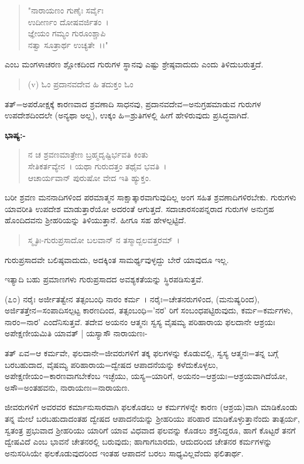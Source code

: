 \begin{verse}
"ನಾರಾಯಣಂ ಗುಣೈಃ ಸರ್ವೈಃ\\ ಉದೀರ್ಣಂ ದೋಷವರ್ಜಿತಂ~।\\ಜ್ಞೇಯಂ ಗಮ್ಯಂ ಗುರೂಂಶ್ಚಾಪಿ\\ ನತ್ವಾ ಸೂತ್ರಾರ್ಥ ಉಚ್ಯತೇ~।।"
\end{verse}

\noindent
ಎಂಬ ಮಂಗಳಾಚರಣ ಶ್ಲೋಕದಿಂದ ಗುರುಗಳ ಸ್ಥಾನವು ಎಷ್ಟು ಶ್ರೇಷ್ಠವಾದುದು ಎಂದು ತಿಳಿದುಬರುತ್ತದೆ.

\begin{verse}
(v) ಓಂ ಪ್ರದಾನವದೇವ ಹಿ ತದುಕ್ತಂ ಓಂ
\end{verse}

ತತ್=ಅಪರೋಕ್ಷಕ್ಕೆ ಕಾರಣವಾದ ಶ್ರವಣಾದಿ ಸಾಧನವು, ಪ್ರದಾನವದೇವ=ಅನುಗ್ರಹಮಾಡುವ ಗುರುಗಳ ಉಪದೇಶದಿಂದಲೇ (ಅನ್ಯಥಾ ಅಲ್ಲ), ಉಕ್ಕಂ ಹಿ=ಶ್ರುತಿಗಳಲ್ಲಿ ಹೀಗೆ ಹೇಳಿರುವುದು ಪ್ರಸಿದ್ಧವಾಗಿದೆ.

\noindent
\textbf{ಭಾಷ್ಯ:-}

\begin{verse}
ನ ಚ ಶ್ರವಣಮಾತ್ರೇಣ ಬ್ರಹ್ಮದೃಷ್ಟಿರ್ಭವತಿ ಕಿಂತು\\ ಸೇತಿಕರ್ತವ್ಯೇನ~। ಯಥಾ ಗುರುದತ್ತಂ ತಥೈವ ಭವತಿ~।\\ ಆಚಾರ್ಯವಾನ್ ಪುರುಷೋ ವೇದ ಇತಿ ಹ್ಯುಕ್ತಂ.
\end{verse}

ಬರೀ ಶ್ರವಣ ಮನನಾದಿಗಳಿಂದ ಪರಮಾತ್ಮನ ಸಾಕ್ಷಾತ್ಕಾರವಾಗುವುದಿಲ್ಲ ಅಂಗ ಸಹಿತ ಶ್ರವಣಾದಿಗಳಿರಬೇಕು. ಗುರುಗಳು ಯಾವರೀತಿ ಉಪದೇಶ ಮಾಡುತ್ತಾರೆಯೋ ಅದರಂತೆ ಆಗುತ್ತದೆ. ಸದಾಚಾರಸಂಪನ್ನರಾದ ಗುರುಗಳ ಅನುಗ್ರಹ ಹೊಂದಿದವನು ಶ‍್ರೀಹರಿಯನ್ನು ತಿಳಿಯುತ್ತಾನೆ. ಹೀಗೂ ಸಹ ಹೇಳಲ್ಪಟ್ಟಿದೆ.

\begin{verse}
ಸ್ಮೃತಿಃ-ಗುರುಪ್ರಸಾದೋ ಬಲವಾನ್ ನ ತಸ್ಮಾದ್ಬಲವತ್ತರಮ್~।
\end{verse}

ಗುರುಪ್ರಸಾದವೇ ಬಲಿಷ್ಠವಾದುದು, ಅದಕ್ಕಿಂತ ಸಾಮರ್ಥ್ಯವುಳ್ಳದ್ದು ಬೇರೆ ಯಾವುದೂ ಇಲ್ಲ.

ಇತ್ಯಾದಿ ಬಹು ಪ್ರಮಾಣಗಳು ಗುರುಪ್ರಸಾದದ ಅವಶ್ಯಕತೆಯನ್ನು ಸ್ಥಿರಪಡಿಸುತ್ತವೆ.

(೭೦) ನರೈಃ ಅರ್ಜೀತತ್ವೇನ ತತ್ಸಂಬಂಧಿ ನಾರಂ ಕರ್ಮ~। ನರೈಃ=ಚೇತನರುಗಳಿಂದ, (ಮನುಷ್ಯರಿಂದ), ಅರ್ಜಿತತ್ತೇನ=ಸಂಪಾದಿಸಲ್ಪಟ್ಟ ಕಾರಣದಿಂದ, ತತ್ಸಂಬಂಧಿ='ನರ' ರಿಗೆ ಸಂಬಂಧಪಟ್ಟಿರುವುದು, ಕರ್ಮ=ಕರ್ಮಗಳು, ನಾರಂ=ನಾರ' ಎಂದೆನಿಸುತ್ತವೆ. ತದೇವ ಅಯನಂ ಆತ್ಮನಃ ಸ್ವಸ್ಯ ವೈಷಮ್ಯ ಪರಿಹಾರಾಯ ಫಲದಾನೇ ಆಶ್ರಯಃ ಅಪೇಕ್ಷಣೀಯಮಿತಿ ಯಾವತ್ | ಯಸ್ಯಾಸೌ ನಾರಾಯಣಃ-

ತತ್ ಏವ=ಆ ಕರ್ಮವೇ, ಫಲದಾನೇ=ಜೀವರುಗಳಿಗೆ ತಕ್ಕ ಫಲಗಳನ್ನು ಕೊಡುವಲ್ಲಿ, ಸ್ವಸ್ಯ ಆತ್ಮನಃ=ತನ್ನ ಬಗ್ಗೆ ಬರಬಹುದಾದ, ವೈಷಮ್ಯ ಪರಿಹಾರಾಯ=ದ್ವೇಷದ ಆಪಾದನೆಯನ್ನು ಕಳೆದುಕೊಳ್ಳಲು, ಅಪೇಕ್ಷಣೀಯಂ=ಕಾರಣವಾಗಬೇಕೆಂಬ ಇಚ್ಛೆಯು, ಯಸ್ಯ=ಯಾರಿಗೆ, ಅಯನಂ=ಆಶ್ರಯಃ=ಆಶ್ರಯವಾಗಿದೆಯೋ, ಅಸೌ=ಅಂತಹವನು, ನಾರಾಯಣಃ=ನಾರಾಯಣ.

ಜೀವರುಗಳಿಗೆ ಅವರವರ ಕರ್ಮಾನುಸಾರವಾಗಿ ಫಲಕೊಡಲು ಆ ಕರ್ಮಗಳನ್ನೇ ಕಾರಣ (ಆಶ್ರಯ)ವಾಗಿ ಮಾಡಿಕೊಂಡು ತನ್ನ ಮೇಲೆ ಬರಬಹುದಾದಂತಹ ದ್ವೇಷದ ಆಪಾದನೆಯನ್ನು ಶ‍್ರೀಹರಿಯು ಪರಿಹಾರ ಮಾಡಿಕೊಳ್ಳುತ್ತಾನೆಂದು ತಾತ್ಪರ್ಯ, ಸ್ವತಂತ್ರ ಪ್ರಭುವಾದ ಶ‍್ರೀಹರಿಯು ಯಾರಿಗೆ ಯಾವ ವಿಧವಾದ ಫಲವನ್ನು ಕೊಡಲು ಶಕ್ತನಿದ್ದರೂ, ಹಾಗೆ ಕೊಟ್ಟರೆ ತನಗೆ ದ್ವೇಷವಿದೆ ಎಂಬ ಭಾವನೆ ಚೇತನರಲ್ಲಿ ಬರುವುದು; ಹಾಗಾಗಬಾರದು, ಆದುದರಿಂದ ಚೇತನರ ಕರ್ಮಗಳನ್ನು ಅನುಸರಿಸಿಯೇ ಫಲಕೊಡುವುದರಿಂದ ಇಂತಹ ಆಪಾದನೆ ಬರಲು ಸಾಧ್ಯವಿಲ್ಲವೆಂದು ಫಲಿತಾರ್ಥ.

